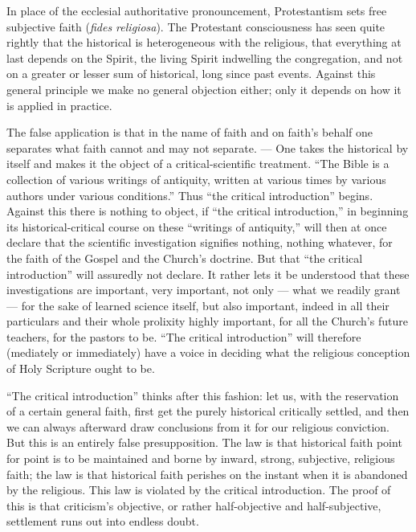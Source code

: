 \documentclass[12pt,a4paper]{book}
\begin{document}
In place of the ecclesial authoritative pronouncement, Protestantism sets free
subjective faith (\textit{fides religiosa}). The Protestant consciousness has
seen quite rightly that the historical is heterogeneous with the religious, that
everything at last depends on the Spirit, the
living Spirit indwelling the congregation, and not on a greater or lesser sum of
historical, long since past events. Against this general principle we make no
general objection either; only it depends on how it is applied in practice.

The false application is that in the name of faith and on faith's behalf one
separates what faith cannot and may not separate. --- One takes the historical
by itself and makes it the object of a critical-scientific treatment. ``The
Bible is a collection of various writings of antiquity, written at various times
by various authors under various conditions.'' Thus ``the critical
introduction'' begins. Against this there is nothing to object, if ``the
critical introduction,'' in beginning its historical-critical course on these
``writings of antiquity,'' will then at once declare that the scientific
investigation signifies nothing, nothing whatever, for the faith of the Gospel
and the Church's doctrine. But that ``the critical introduction'' will assuredly
not declare. It rather lets it be understood that these investigations are
important, very important, not only --- what we readily grant --- for the sake
of learned science itself, but also important, indeed in all their particulars
and their whole prolixity highly important, for all the Church's future
teachers, for the pastors to be. ``The critical introduction'' will therefore
(mediately or immediately) have a voice in deciding what the religious
conception of Holy Scripture ought to be.

``The critical introduction'' thinks after this fashion: let us, with the
reservation of a certain general faith, first get the purely historical
critically settled, and then we can always afterward draw conclusions from it
for our religious conviction. But this is an entirely false presupposition. The
law is that historical faith point for point is to be maintained and borne by
inward, strong, subjective, religious faith; the law is that historical faith
perishes on the instant when it is abandoned by the religious. This law
is violated by the critical introduction. The proof of this is that criticism's
objective, or rather half-objective and half-subjective, settlement runs out
into endless doubt.
\end{document}
